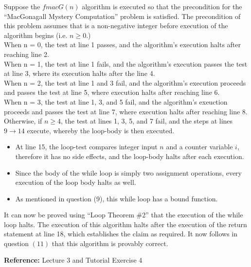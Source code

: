 \documentclass[12pt]{article}
\newenvironment{problem}[2][Problem]{\begin{trivlist}
\item[\hskip \labelsep {\bfseries #1}\hskip \labelsep {\bfseries #2.}]}{\end{trivlist}}
\begin{document}
\begin{problem}{10}
Suppose the $fmacG(n)$ algorithm is executed so that the precondition for the “MacGonagall Mystery Computation” problem is satisfied. The precondition of this problem assumes that is a non-negative integer before execution of the algorithm begins (i.e. $n \geq 0$.) \\

\noindent
When n = 0, the test at line 1 passes, and the algorithm's execution halts after reaching line 2. \\

\noindent
When n = 1, the test at line 1 fails, and the algorithm's execution passes the test at line 3, where its execution halts after the line 4. \\

\noindent
When n = 2, the test at line 1 and 3 fail, and the algorithm's execution proceeds and passes the test at line 5, where execution halts after reaching line 6. \\

\noindent
When n = 3, the test at line 1, 3, and 5 fail, and the algorithm's exeuction proceeds and passes the test at line 7, where execution halts after reaching line 8. \\

\noindent
Otherwise, if $n \geq 4$, the test at lines 1, 3, 5, and 7 fail, and the steps at lines $9 \rightarrow 14$ execute, whereby the loop-body is then executed.

\begin{itemize}
    \item At line 15, the loop-test compares integer input $n$ and a counter variable $i$, therefore it has no side effects, and the loop-body halts after each execution.
    \item Since the body of the while loop is simply two assignment operations, every execution of the loop body halts as well.
    \item As mentioned in question (9), this while loop has a bound function.
\end{itemize}

\noindent
It can now be proved using ``Loop Theorem \#2'' that the execution of the while loop halts. The execution of this algorithm halts after the execution of the return statement at line 18, which establishes the claim as required. It now follows in question $(11)$ that this algorithm is provably correct.

\noindent
\textbf{Reference: }Lecture 3 and Tutorial Exercise 4

\end{problem}
\end{document}

